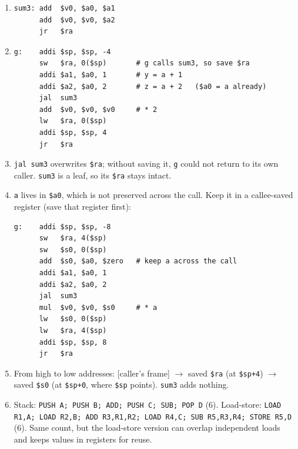 \documentclass[11pt]{article}
\begin{document}
\begin{solution}[\ref{x:proc}]
\leavevmode
\begin{enumerate}[label=(\alph*),leftmargin=*]
  \item
\begin{lstlisting}
sum3: add  $v0, $a0, $a1
      add  $v0, $v0, $a2
      jr   $ra
\end{lstlisting}
  \item
\begin{lstlisting}
g:    addi $sp, $sp, -4
      sw   $ra, 0($sp)       # g calls sum3, so save $ra
      addi $a1, $a0, 1       # y = a + 1
      addi $a2, $a0, 2       # z = a + 2   ($a0 = a already)
      jal  sum3
      add  $v0, $v0, $v0     # * 2
      lw   $ra, 0($sp)
      addi $sp, $sp, 4
      jr   $ra
\end{lstlisting}
  \item \texttt{jal sum3} overwrites \texttt{\$ra}; without saving it,
  \texttt{g} could not return to its own caller. \texttt{sum3} is a leaf, so
  its \texttt{\$ra} stays intact.
  \item \texttt{a} lives in \texttt{\$a0}, which is not preserved across the
  call. Keep it in a callee-saved register (save that register first):
\begin{lstlisting}
g:    addi $sp, $sp, -8
      sw   $ra, 4($sp)
      sw   $s0, 0($sp)
      add  $s0, $a0, $zero   # keep a across the call
      addi $a1, $a0, 1
      addi $a2, $a0, 2
      jal  sum3
      mul  $v0, $v0, $s0     # * a
      lw   $s0, 0($sp)
      lw   $ra, 4($sp)
      addi $sp, $sp, 8
      jr   $ra
\end{lstlisting}
  \item From high to low addresses: [caller's frame] $\to$ saved
  \texttt{\$ra} (at \texttt{\$sp+4}) $\to$ saved \texttt{\$s0} (at
  \texttt{\$sp+0}, where \texttt{\$sp} points). \texttt{sum3} adds nothing.
  \item Stack: \texttt{PUSH A; PUSH B; ADD; PUSH C; SUB; POP D} (6).
  Load-store: \texttt{LOAD R1,A; LOAD R2,B; ADD R3,R1,R2; LOAD R4,C; SUB
  R5,R3,R4; STORE R5,D} (6). Same count, but the load-store version can
  overlap independent loads and keeps values in registers for reuse.
\end{enumerate}
\end{solution}
\end{document}
